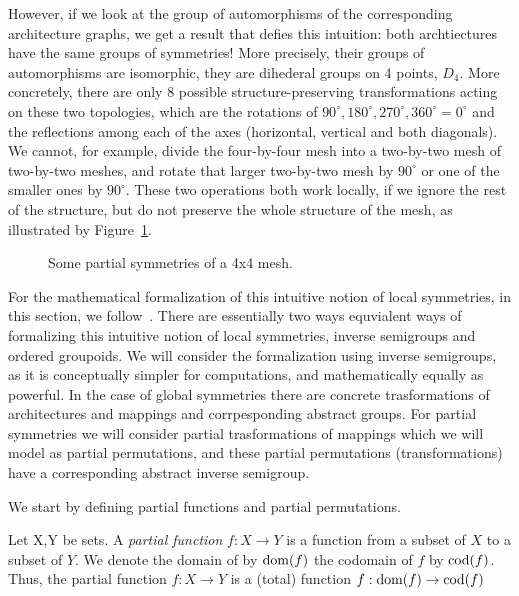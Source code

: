 However, if we look at the group of automorphisms of the corresponding architecture graphs, we get a result that defies this intuition:
both archtiectures have the same groups of symmetries!
More precisely, their groups of automorphisms are isomorphic, they are dihederal groups on 4 points, $D_4$.
More concretely, there are only 8  possible structure-preserving transformations acting on these two topologies, which are the rotations of $90^\circ,180^\circ,270^\circ,360^\circ = 0^\circ$ and the reflections among each of the axes (horizontal, vertical and both diagonals). We cannot, for example, divide the four-by-four mesh into a two-by-two mesh of two-by-two meshes, and rotate that larger two-by-two mesh by $90^\circ$ or one of the smaller ones by $90^\circ$. These two operations both work locally, if we ignore the rest of the structure, but do not preserve the whole structure of the mesh, as illustrated by Figure~\ref{fig:partial_symmetries_4x4}.

\begin{figure}[h]
	\centering
   \resizebox{0.55\textwidth}{!}{}
	\caption{Some partial symmetries of a 4x4 mesh.}
	\label{fig:partial_symmetries_4x4}
\end{figure}

For the mathematical formalization of this intuitive notion of local symmetries, in this section, we follow~\cite{lawson_inverse_semigroups}.
There are essentially two ways equvialent ways of formalizing this intuitive notion of local symmetries, inverse semigroups and ordered groupoids.
We will consider the formalization using inverse semigroups, as it is conceptually simpler for computations, and mathematically equally as powerful.
In the case of global symmetries there are concrete trasformations of architectures and mappings and corrpesponding abstract groups. For partial symmetries we will consider partial trasformations of mappings which we will model as partial permutations, and these partial permutations (transformations) have a corresponding abstract inverse semigroup.

We start by defining partial functions and partial permutations.
\begin{defn}
Let X,Y be sets.
A \emph{partial function} $f: X \rightarrow Y$ is a function from a subset of $X$ to a subset of $Y$.
We denote the domain of by $\operatorname{dom}(f)$ the codomain of $f$ by $\operatorname{cod}(f)$.
Thus, the partial function $f: X \rightarrow Y$ is a (total) function $f: \operatorname{dom}(f) \rightarrow \operatorname{cod}(f)$
\end{defn}

